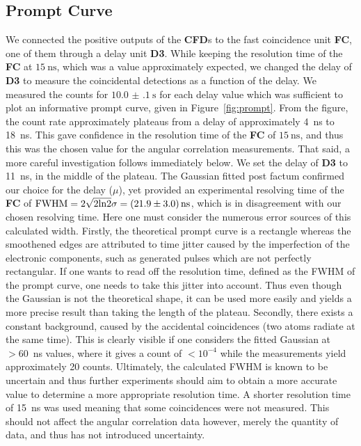 \documentclass[twocolumn]{article}
\begin{document}
\subsection{Prompt Curve}
We connected the positive outputs of the \textbf{CFD}s to the fast coincidence unit \textbf{FC}, one of them through a delay unit \textbf{D3}. While keeping the resolution time of the \textbf{FC} at $\SI{15}{\nano\second}$, which was a value approximately expected, we changed the delay of \textbf{D3} to measure the coincidental detections as a function of the delay. We measured the counts for $\SI[separate-uncertainty = true]{10.0(1) }{\second}$ for each delay value which was sufficient to plot an informative prompt curve, given in Figure~\ref{fig:prompt}. From the figure, the count rate approximately plateaus from a delay of approximately 4~ns to 18~ns. This gave confidence in the resolution time of the \textbf{FC} of $\SI{15}{\nano\second}$, and thus this was the chosen value for the angular correlation measurements. That said, a more careful investigation follows immediately below. We set the delay of \textbf{D3} to 11~ns, in the middle of the plateau. The Gaussian fitted post factum confirmed our choice for the delay ($\mu$), yet provided an experimental resolving time of the \textbf{FC} of $\text{FWHM} = 2 \sqrt{2 \text{ln}2} \sigma = \SI[separate-uncertainty = true]{21.9 \pm 3.0}{\nano \second}$,\cite{signal} which is in disagreement with our chosen resolving time. Here one must consider the numerous error sources of this calculated width. Firstly, the theoretical prompt curve is a rectangle\cite{leo} whereas the smoothened edges are attributed to time jitter caused by the imperfection of the electronic components, such as generated pulses which are not perfectly rectangular. If one wants to read off the resolution time, defined as the FWHM of the prompt curve, one needs to take this jitter into account. Thus even though the Gaussian is not the theoretical shape, it can be used more easily and yields a more precise result than taking the length of the plateau.\cite{leo} Secondly, there exists a constant background, caused by the accidental coincidences (two atoms radiate at the same time). This is clearly visible if one considers the fitted Gaussian at $>60$~ns values, where it gives a count of $<10^{-4}$ while the measurements yield approximately 20 counts. Ultimately, the calculated FWHM is known to be uncertain and thus further experiments should aim to obtain a more accurate value to determine a more appropriate resolution time. A shorter resolution time of 15~ns was used meaning that some coincidences were not measured. This should not affect the angular correlation data however, merely the quantity of data, and thus has not introduced uncertainty.
\end{document}
